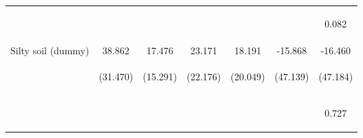 \begin{center}
\begin{tabular}{lcccccc}
\vspace{4pt} & \begin{footnotesize}[0.350]\end{footnotesize} & \begin{footnotesize}[0.195]\end{footnotesize} & \begin{footnotesize}[0.008]\end{footnotesize} & \begin{footnotesize}[0.671]\end{footnotesize} & \begin{footnotesize}[0.058]\end{footnotesize} & \begin{footnotesize}0.082\end{footnotesize} \\
Silty soil (dummy) & 38.862 & 17.476 & 23.171 & 18.191 & -15.868 & -16.460 \\
 & \begin{footnotesize}(31.470)\end{footnotesize} & \begin{footnotesize}(15.291)\end{footnotesize} & \begin{footnotesize}(22.176)\end{footnotesize} & \begin{footnotesize}(20.049)\end{footnotesize} & \begin{footnotesize}(47.139)\end{footnotesize} & \begin{footnotesize}(47.184)\end{footnotesize} \\
\vspace{4pt} & \begin{footnotesize}[0.217]\end{footnotesize} & \begin{footnotesize}[0.253]\end{footnotesize} & \begin{footnotesize}[0.296]\end{footnotesize} & \begin{footnotesize}[0.364]\end{footnotesize} & \begin{footnotesize}[0.736]\end{footnotesize} & \begin{footnotesize}0.727\end{footnotesize} \\

\end{tabular}
\end{center}

